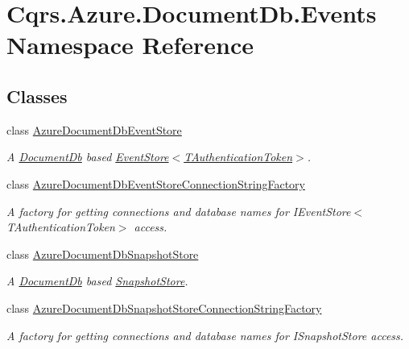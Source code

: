 \hypertarget{namespaceCqrs_1_1Azure_1_1DocumentDb_1_1Events}{}\section{Cqrs.\+Azure.\+Document\+Db.\+Events Namespace Reference}
\label{namespaceCqrs_1_1Azure_1_1DocumentDb_1_1Events}
\subsection*{Classes}
\begin{DoxyCompactItemize}
\item 
class \hyperlink{classCqrs_1_1Azure_1_1DocumentDb_1_1Events_1_1AzureDocumentDbEventStore}{Azure\+Document\+Db\+Event\+Store}
\begin{DoxyCompactList}\small\item\em A \hyperlink{namespaceCqrs_1_1Azure_1_1DocumentDb}{Document\+Db} based \hyperlink{classCqrs_1_1Events_1_1EventStore_a6346cb2aea4c5b4e740dc6cfb15abab8_a6346cb2aea4c5b4e740dc6cfb15abab8}{Event\+Store$<$\+T\+Authentication\+Token$>$}. \end{DoxyCompactList}\item 
class \hyperlink{classCqrs_1_1Azure_1_1DocumentDb_1_1Events_1_1AzureDocumentDbEventStoreConnectionStringFactory}{Azure\+Document\+Db\+Event\+Store\+Connection\+String\+Factory}
\begin{DoxyCompactList}\small\item\em A factory for getting connections and database names for I\+Event\+Store$<$\+T\+Authentication\+Token$>$ access. \end{DoxyCompactList}\item 
class \hyperlink{classCqrs_1_1Azure_1_1DocumentDb_1_1Events_1_1AzureDocumentDbSnapshotStore}{Azure\+Document\+Db\+Snapshot\+Store}
\begin{DoxyCompactList}\small\item\em A \hyperlink{namespaceCqrs_1_1Azure_1_1DocumentDb}{Document\+Db} based \hyperlink{classCqrs_1_1Snapshots_1_1SnapshotStore_aa8ab186f864443c7d9647a4522864a84_aa8ab186f864443c7d9647a4522864a84}{Snapshot\+Store}. \end{DoxyCompactList}\item 
class \hyperlink{classCqrs_1_1Azure_1_1DocumentDb_1_1Events_1_1AzureDocumentDbSnapshotStoreConnectionStringFactory}{Azure\+Document\+Db\+Snapshot\+Store\+Connection\+String\+Factory}
\begin{DoxyCompactList}\small\item\em A factory for getting connections and database names for I\+Snapshot\+Store access. \end{DoxyCompactList}\item 

\end{DoxyCompactItemize}
